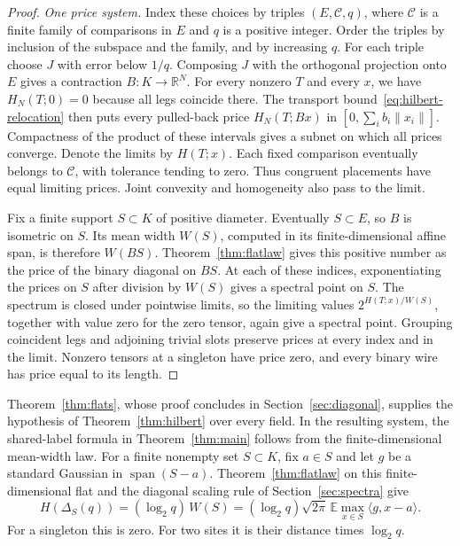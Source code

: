 \begin{proof}
\emph{One price system.}
Index these choices by triples $(E,\mathcal C,q)$, where $\mathcal C$
is a finite family of comparisons in $E$ and $q$ is a positive
integer. Order the triples by inclusion of the subspace and the family,
and by increasing $q$. For each triple choose $J$ with error below
$1/q$. Composing $J$ with the orthogonal projection onto $E$ gives a
contraction $B\colon K\to\mathbb R^N$. For every nonzero $T$ and
every $x$, we have $H_N(T;0)=0$ because all legs coincide there.
The transport bound~\eqref{eq:hilbert-relocation} then puts every
pulled-back price $H_N(T;Bx)$ in $[0,\sum_i b_i\|x_i\|]$.
Compactness of the product of these intervals gives a subnet on which
all prices converge. Denote the limits by $H(T;x)$. Each fixed
comparison eventually belongs to $\mathcal C$, with tolerance tending
to zero. Thus congruent placements have equal limiting prices. Joint
convexity and homogeneity also pass to the limit.

Fix a finite support $S\subset K$ of positive diameter. Eventually
$S\subset E$, so $B$ is isometric on $S$. Its mean width $W(S)$,
computed in its finite-dimensional affine span, is therefore $W(BS)$.
Theorem~\ref{thm:flatlaw} gives this positive number as the price of
the binary diagonal on $BS$. At each of these indices, exponentiating the prices on $S$ after division by
$W(S)$ gives a spectral point on $S$. The spectrum is closed under
pointwise limits, so the limiting values $2^{H(T;x)/W(S)}$, together
with value zero for the zero tensor, again give a spectral point.
Grouping coincident legs and adjoining trivial slots preserve prices
at every index and in the limit. Nonzero tensors at a singleton have
price zero, and every binary wire has price equal to its length.
\end{proof}

Theorem~\ref{thm:flats}, whose proof concludes in
Section~\ref{sec:diagonal}, supplies the hypothesis of
Theorem~\ref{thm:hilbert} over every field. In the resulting system,
the shared-label formula in Theorem~\ref{thm:main} follows from
the finite-dimensional mean-width law. For a finite nonempty
set $S\subset K$, fix $a\in S$ and let $g$ be a standard Gaussian
in $\operatorname{span}(S-a)$. Theorem~\ref{thm:flatlaw} on this
finite-dimensional flat and the diagonal scaling rule of
Section~\ref{sec:spectra} give
\[
 H(\Delta_S(q))=(\log_2 q)\,W(S)
  =(\log_2 q)\sqrt{2\pi}\,\mathbb E\max_{x\in S}\langle g,x-a\rangle .
\]
For a singleton this is zero. For two sites it is their distance times
$\log_2 q$.

